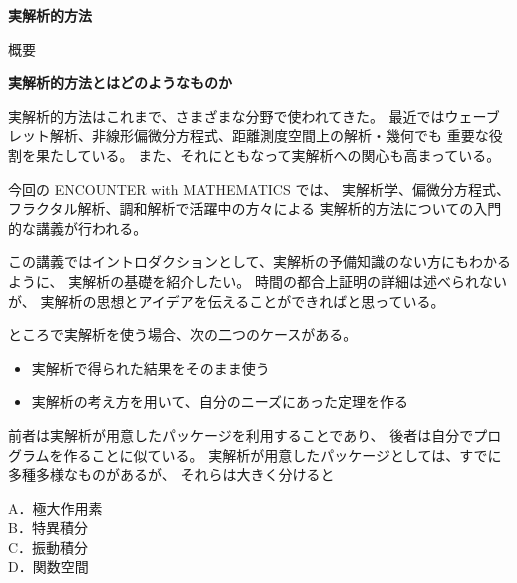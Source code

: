 \documentclass[uplatex,dvipdfmx]{jlreq}
\begin{document}
\begin{center}
  \vspace*{20pt}
  {\Huge\bfseries 実解析的方法}

  \vspace{1pc}
  {\Large 概要}
\end{center}

\vfill

\newpage

\begin{center}
  {\large\bfseries 実解析的方法とはどのようなものか}
\end{center}

\bigskip
\hspace*{\fill}{\large\bfseries 新井　仁之（東大・数理）}

\bigskip

実解析的方法はこれまで、さまざまな分野で使われてきた。
最近ではウェーブレット解析、非線形偏微分方程式、距離測度空間上の解析・幾何でも
重要な役割を果たしている。
また、それにともなって実解析への関心も高まっている。

今回の ENCOUNTER with MATHEMATICS では、
実解析学、偏微分方程式、フラクタル解析、調和解析で活躍中の方々による
実解析的方法についての入門的な講義が行われる。

この講義ではイントロダクションとして、実解析の予備知識のない方にもわかるように、
実解析の基礎を紹介したい。
時間の都合上証明の詳細は述べられないが、
実解析の思想とアイデアを伝えることができればと思っている。

ところで実解析を使う場合、次の二つのケースがある。
\begin{itemize}
  \item 実解析で得られた結果をそのまま使う
  \item 実解析の考え方を用いて、自分のニーズにあった定理を作る
\end{itemize}

前者は実解析が用意したパッケージを利用することであり、
後者は自分でプログラムを作ることに似ている。
実解析が用意したパッケージとしては、すでに多種多様なものがあるが、
それらは大きく分けると

\medskip
\noindent
A．極大作用素\\
B．特異積分\\
C．振動積分\\
D．関数空間
\medskip
\end{document}
